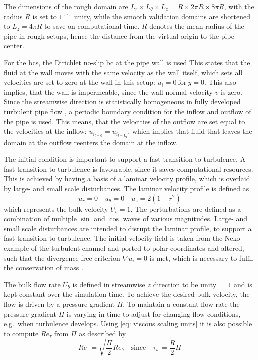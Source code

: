 The dimensions of the rough domain are $L_r \times L_\theta \times L_z = R \times 2\pi R \times 8\pi R$, with the radius $R$ is set to $1 \hat{=}$ unity, while the smooth validation domains are shortened to $L_z = 4\pi R$ to save on computational time.
$R$ denotes the mean radius of the pipe in rough setups, hence the distance from the virtual origin to the pipe center.

For the \acrfull{bcs}, the Dirichlet no-slip \acrshort{bc} at the pipe wall is used
This states that the fluid at the wall  moves with the same velocity as the wall itself, which sets all velocities are set to zero at the wall in this setup: $u_i = 0 \ \text{for}\ y = 0$.
This also implies, that the wall is impermeable, since the wall normal velocity $v$ is zero.
Since the streamwise direction is statistically homogeneous in fully developed turbulent pipe flow \citep{moinDIRECTNUMERICALSIMULATION1998}, a periodic boundary condition for the inflow and outflow of the pipe is used.
This means, that the velocities of the outflow are set equal to the velocities at the inflow: $u_{i_{l = 0}} = u_{i_{l=L_z}}$, which implies that fluid that leaves the domain at the outflow reenters the domain at the inflow.

The initial condition is important to support a fast transition to turbulence.
A fast transition to turbulence is favourable, since it saves computational resources.
This is achieved by having a basis of a laminar velocity profile, which is overlaid by large- and small scale disturbances.
The laminar velocity profile is defined as
\begin{equation}\label{eq: laminar velocity profile}
    u_r = 0 \quad u_\theta = 0 \quad u_z = 2(1-r^2)
\end{equation}
which represents the bulk velocity $U_b = 1$.
The perturbations are defined as a combination of multiple $\sin$ and $\cos$ waves of various magnitudes.
Large- and small scale disturbances are intended to disrupt the laminar profile, to support a fast transition to turbulence.
The initial velocity field is taken from the Neko example of the turbulent channel and ported to polar coordinates and altered, such that the divergence-free criterion $\nabla u_i = 0$ is met, which is necessary to fulfil the conservation of mass \citep{popeTurbulentFlows2015}.

The bulk flow rate $U_b$ is defined in streamwise $z$ direction to be unity $=1$ and is kept constant over the simulation time.
To achieve the desired bulk velocity, the flow is driven by a pressure gradient $\Pi$.
To maintain a constant flow rate the pressure gradient $\Pi$ is varying in time to adjust for changing flow conditions, e.g.\ when turbulence develops.
Using \autoref{eq: viscous scaling units} it is also possible to compute $Re_\tau$ from $\Pi$  as described by~\cite{demaioDirectNumericalSimulation2023}
\begin{equation} \label{eq: REtau from forcing}
    Re_\tau = \sqrt{\frac{\Pi}{2}}Re_b \quad \text{since} \quad \tau_w = \frac{R}{2}\Pi 
\end{equation}

